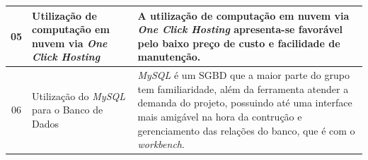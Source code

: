 \begin{apendicesenv}
\begin{table}[H]
\begin{adjustbox}{max width = 1\textwidth}
\begin{tabular}{|c|p{5cm}|p{10cm}|}
            \hline
            05 & Utilização de computação em nuvem via \textit{One Click Hosting}  & A utilização de computação em nuvem via \emph{One Click Hosting} apresenta-se favorável pelo baixo preço de custo e facilidade de manutenção.\\
            \hline
            06 & Utilização do \textit{MySQL} para o Banco de Dados & \textit{MySQL} é um SGBD que a maior parte do grupo tem familiaridade, além da ferramenta atender a demanda do projeto, possuindo até uma interface mais amigável na hora da contrução e gerenciamento das relações do banco, que é com o \textit{workbench}. \\ 
            \hline
        \end{tabular}
    \end{adjustbox}
\end{table}


\end{apendicesenv}
